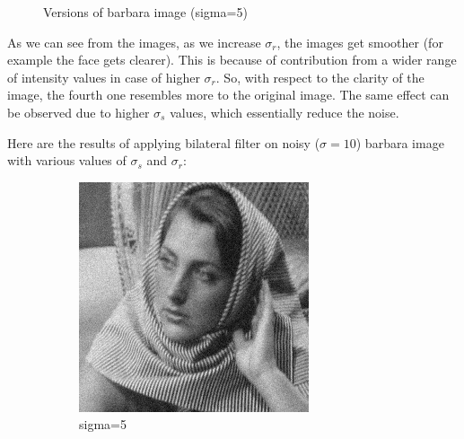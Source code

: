 \documentclass[12pt]{article}
\begin{document}
\begin{figure}[h]
    \caption{Versions of barbara image (sigma=5)}
    \label{fig:overall}
\end{figure}

As we can see from the images, as we increase $\sigma_r$, the images get smoother (for example the face gets clearer). This is because of contribution from a wider range of intensity values in case of higher $\sigma_r$. So, with respect to the clarity of the image, the fourth one resembles more to the original image. The same effect can be observed due to higher $\sigma_s$ values, which essentially reduce the noise.


Here are the results of applying bilateral filter on noisy ($\sigma = 10$) barbara image with various values of $\sigma_s$ and $\sigma_r$:



\begin{figure}[h]
    \centering
    \begin{subfigure}[b]{0.24\textwidth}
        \centering
        \includegraphics[width=\textwidth]{../images/noisy_barbara_10.png}
        \caption{sigma=5}
        \label{Noisy (sigma=10)}
    \end{subfigure}
    \begin{subfigure}[b]{0.24\textwidth}
        \centering

\end{subfigure}
\end{figure}
\end{document}
